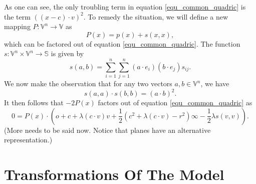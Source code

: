 \documentclass{birkjour}
\theoremstyle{definition}
\theoremstyle{remark}
\numberwithin{equation}{section}
\newcommand{\V}{\mathbb{V}}
\newcommand{\VS}{\mathbb{S}}
\newcommand{\nvao}{o}
\newcommand{\nvai}{\infty}
\begin{document}
As one can see, the only troubling term in equation \eqref{equ_common_quadric} is the
term $((x-c)\cdot v)^2$.  To remedy the situation, we will define a new mapping
$P:\V^n\to\V$ as
\begin{equation}
P(x) = p(x)+s(x,x),
\end{equation}
which can be factored out of equation \eqref{equ_common_quadric}.  The
function $s:\V^n\times\V^n\to\VS$ is given by
\begin{equation}
s(a,b) = \sum_{i=1}^n\sum_{j=1}^n(a\cdot e_i)(b\cdot e_j)s_{ij}.
\end{equation}
We now make the observation that for any two vectors $a,b\in\V^n$, we have
\begin{equation}
s(a,a)\cdot s(b,b) = (a\cdot b)^2.
\end{equation}
It then follows that $-2P(x)$ factors out of equation \eqref{equ_common_quadric} as
\begin{equation}
0 = P(x)\cdot\left(\nvao+c+\lambda(c\cdot v)v+\frac{1}{2}(c^2+\lambda(c\cdot v)-r^2)\nvai-
\frac{1}{2}\lambda s(v,v)\right).
\end{equation}
(More needs to be said now.  Notice that planes have an alternative representation.)

\section{Transformations Of The Model}





\end{document}
